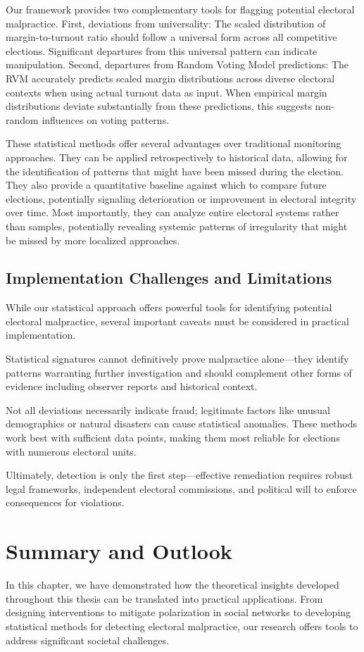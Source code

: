 Our framework provides two complementary tools for flagging potential electoral malpractice. First, deviations from universality: The scaled distribution of margin-to-turnout ratio should follow a universal form across all competitive elections. Significant departures from this universal pattern can indicate manipulation. Second, departures from Random Voting Model predictions: The RVM accurately predicts scaled margin distributions across diverse electoral contexts when using actual turnout data as input. When empirical margin distributions deviate substantially from these predictions, this suggests non-random influences on voting patterns.

These statistical methods offer several advantages over traditional monitoring approaches. They can be applied retrospectively to historical data, allowing for the identification of patterns that might have been missed during the election. They also provide a quantitative baseline against which to compare future elections, potentially signaling deterioration or improvement in electoral integrity over time. Most importantly, they can analyze entire electoral systems rather than samples, potentially revealing systemic patterns of irregularity that might be missed by more localized approaches.

\subsection{Implementation Challenges and Limitations}

While our statistical approach offers powerful tools for identifying potential electoral malpractice, several important caveats must be considered in practical implementation. 

Statistical signatures cannot definitively prove malpractice alone—they identify patterns warranting further investigation and should complement other forms of evidence including observer reports and historical context. 

Not all deviations necessarily indicate fraud; legitimate factors like unusual demographics or natural disasters can cause statistical anomalies. These methods work best with sufficient data points, making them most reliable for elections with numerous electoral units. 

Ultimately, detection is only the first step—effective remediation requires robust legal frameworks, independent electoral commissions, and political will to enforce consequences for violations.
\section{Summary and Outlook}
In this chapter, we have demonstrated how the theoretical insights developed throughout this thesis can be translated into practical applications. From designing interventions to mitigate polarization in social networks to developing statistical methods for detecting electoral malpractice, our research offers tools to address significant societal challenges.


